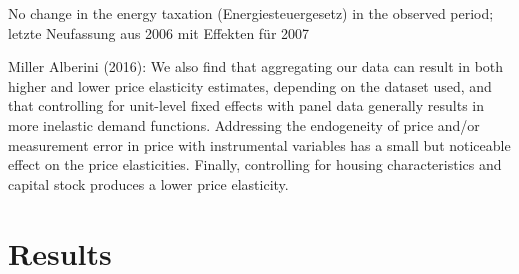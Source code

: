 \documentclass[12pt,twoside]{reedthesis}
\begin{document}
No change in the energy taxation (Energiesteuergesetz) in the observed period; letzte Neufassung aus 2006 mit Effekten für 2007

Miller Alberini (2016):
We also find that aggregating our data can result in both higher and lower price elasticity estimates, depending on the dataset used, and that controlling for unit-level fixed effects with panel data generally results in more inelastic demand functions. Addressing the endogeneity of price and/or measurement error in price with instrumental variables has a small but noticeable effect on the price elasticities. Finally, controlling for housing characteristics and capital stock produces a lower price elasticity.

\hypertarget{results}{%
\chapter{Results}\label{results}}
\end{document}
